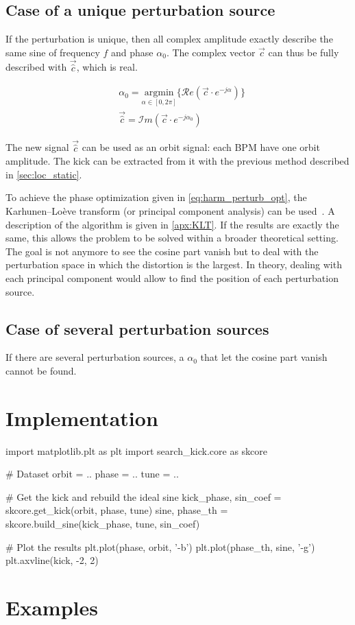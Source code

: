\subsection{Case of a unique perturbation source}

If the perturbation is unique, then all complex amplitude exactly describe the same sine of frequency $f$ and phase $\alpha_0$. The complex vector $\vec{c}$ can thus be fully described with $\vec{\hat{c}}$, which is real.

\begin{align}
&\alpha_0 = \underset{\alpha \in [0, 2\pi]}{\textrm{argmin}}\{\mathcal{R}e (\vec{c} \cdot e^{-j\alpha}) \} \label{eq:harm_perturb_opt}\\
&\vec{\hat{c}} = \mathcal{I}m (\vec{c} \cdot e^{-j\alpha_0})
\end{align}

The new signal $\vec{\hat{c}}$ can be used as an orbit signal: each BPM have one orbit amplitude. The kick can be extracted from it with the previous method described in \cref{sec:loc_static}.

\remark To achieve the phase optimization given in \cref{eq:harm_perturb_opt}, the Karhunen–Loève transform (or principal component analysis) can be used~\cite{book:wang_2012}. A description of the algorithm is given in \cref{apx:KLT}. If the results are exactly the same, this allows the problem to be solved within a broader theoretical setting. The goal is not anymore to see the cosine part vanish but to deal with the perturbation space in which the distortion is the largest. In theory, dealing with each principal component would allow to find the position of each perturbation source.

\subsection{Case of several perturbation sources}
If there are several perturbation sources, a $\alpha_0$ that let the cosine part vanish cannot be found. 


\section{Implementation}
\begin{python}[caption=Get the kick]
	import matplotlib.plt as plt
	import search_kick.core as skcore
	
	# Dataset
	orbit = ..
	phase = ..
	tune = ..
	
	# Get the kick and rebuild the ideal sine
	kick_phase, sin_coef = skcore.get_kick(orbit, phase, tune)
	sine, phase_th = skcore.build_sine(kick_phase, tune, sin_coef)
	
	# Plot the results
	plt.plot(phase, orbit, '-b')
	plt.plot(phase_th, sine, '-g')
	plt.axvline(kick, -2, 2)	
\end{python}


\section{Examples}

